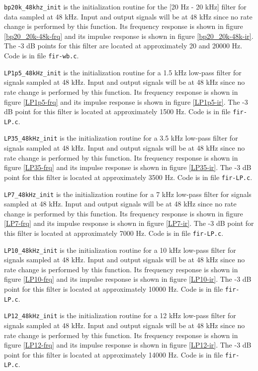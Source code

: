 {\tt bp20k\_48khz\_init} is the initialization routine for the
[20 Hz - 20 kHz] filter for data sampled at 48 kHz. Input and output
signals will be at 48 kHz since no rate change is performed by this
function. Its frequency response is shown in figure
\ref{bp20_20k-48k-frq} and its impulse response is shown in figure
\ref{bp20_20k-48k-ir}. The -3 dB points for this filter are located
at approximately 20 and 20000 Hz. Code is in file {\tt fir-wb.c}.

{\tt LP1p5\_48kHz\_init} is the initialization routine for a 1.5 kHz
low-pass filter for signals sampled at 48 kHz. Input and output
signals will be at 48 kHz since no rate change is performed by this
function. Its frequency response is shown in figure \ref{LP1p5-frq}
and its impulse response is shown in figure \ref{LP1p5-ir}. The -3
dB point for this filter is located at approximately 1500 Hz. Code
is in file {\tt fir-LP.c}.

{\tt LP35\_48kHz\_init} is the initialization routine for a 3.5 kHz
low-pass filter for signals sampled at 48 kHz. Input and output
signals will be at 48 kHz since no rate change is performed by this
function. Its frequency response is shown in figure \ref{LP35-frq}
and its impulse response is shown in figure \ref{LP35-ir}. The -3 dB
point for this filter is located at approximately 3500 Hz. Code is
in file {\tt fir-LP.c}.

{\tt LP7\_48kHz\_init} is the initialization routine for a 7 kHz
low-pass filter for signals sampled at 48 kHz. Input and output
signals will be at 48 kHz since no rate change is performed by this
function. Its frequency response is shown in figure \ref{LP7-frq}
and its impulse response is shown in figure \ref{LP7-ir}. The -3 dB
point for this filter is located at approximately 7000 Hz. Code is
in file {\tt fir-LP.c}.

{\tt LP10\_48kHz\_init} is the initialization routine for a 10 kHz
low-pass filter for signals sampled at 48 kHz. Input and output
signals will be at 48 kHz since no rate change is performed by this
function. Its frequency response is shown in figure \ref{LP10-frq}
and its impulse response is shown in figure \ref{LP10-ir}. The -3 dB
point for this filter is located at approximately 10000 Hz. Code is
in file {\tt fir-LP.c}.

{\tt LP12\_48kHz\_init} is the initialization routine for a 12 kHz
low-pass filter for signals sampled at 48 kHz. Input and output
signals will be at 48 kHz since no rate change is performed by this
function. Its frequency response is shown in figure \ref{LP12-frq}
and its impulse response is shown in figure \ref{LP12-ir}. The -3 dB
point for this filter is located at approximately 14000 Hz. Code is
in file {\tt fir-LP.c}.

